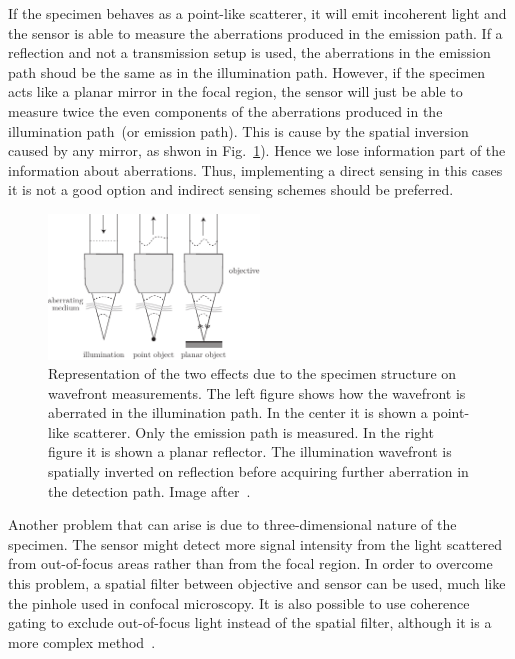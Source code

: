 If the specimen behaves as a point-like scatterer, it will emit incoherent light and the sensor is able to measure the aberrations produced in the emission path. If a reflection and not a transmission setup is used, the aberrations in the emission path shoud be the same as in the illumination path. However, if the specimen acts like a planar mirror in the focal region, the sensor will just be able to measure twice the even components of the aberrations produced in the illumination path~(or emission path). This is cause by the spatial inversion caused by any mirror, as shwon in Fig.~\ref{fig:abe_direct_sensing}). Hence we lose information part of the information about aberrations. Thus, implementing a direct sensing in this cases it is not a good option and indirect sensing schemes should be preferred.

\begin{figure}[htbp]
	\centering
		\includegraphics[width=0.50\textwidth]{images/abe_direct_sensing}
	\caption{Representation of the two effects due to the specimen structure on wavefront measurements. The left figure shows how the wavefront is aberrated in the illumination path. In the center it is shown a point-like scatterer. Only the emission path is measured. In the right figure it is shown a planar reflector. The illumination wavefront is spatially inverted on reflection before acquiring further aberration in the detection path. Image after~\cite{AOM_basic_ref}.}
	\label{fig:abe_direct_sensing}
\end{figure}

Another problem that can arise is due to three-dimensional nature of the specimen. The sensor might detect more signal intensity from the light scattered from out-of-focus areas rather than from the focal region. In order to overcome this problem, a spatial filter between objective and sensor can be used, much like the pinhole used in confocal microscopy. It is also possible to use coherence gating to exclude out-of-focus light instead of the spatial filter, although it is a more complex method~\cite{scan_TPFM_gated_wavefront}. 


